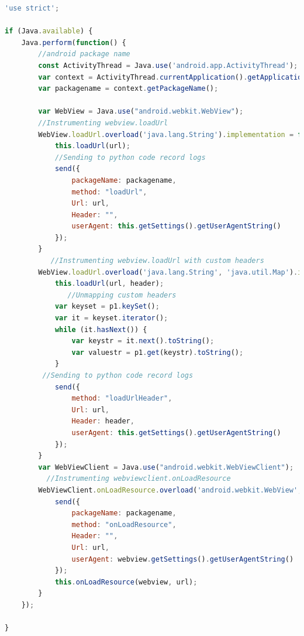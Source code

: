\begin{lstlisting}[language=JavaScript, caption=Instrumentation of Webview]    
    'use strict';

if (Java.available) {
    Java.perform(function() {
        //android package name 
        const ActivityThread = Java.use('android.app.ActivityThread');
        var context = ActivityThread.currentApplication().getApplicationContext();
        var packagename = context.getPackageName();
        
        var WebView = Java.use("android.webkit.WebView");
        //Instrumenting webview.loadUrl 
        WebView.loadUrl.overload('java.lang.String').implementation = function(url) {
            this.loadUrl(url);
            //Sending to python code record logs
            send({
                packageName: packagename,
                method: "loadUrl",
                Url: url,
                Header: "",
                userAgent: this.getSettings().getUserAgentString()
            });
        }
           //Instrumenting webview.loadUrl with custom headers
        WebView.loadUrl.overload('java.lang.String', 'java.util.Map').implementation = function(url, header) {
            this.loadUrl(url, header);
               //Unmapping custom headers
            var keyset = p1.keySet();
            var it = keyset.iterator();
            while (it.hasNext()) {
                var keystr = it.next().toString();
                var valuestr = p1.get(keystr).toString();
            }
         //Sending to python code record logs
            send({
                method: "loadUrlHeader",
                Url: url,
                Header: header,
                userAgent: this.getSettings().getUserAgentString()
            });
        }
        var WebViewClient = Java.use("android.webkit.WebViewClient");
          //Instrumenting webviewclient.onLoadResource
        WebViewClient.onLoadResource.overload('android.webkit.WebView', 'java.lang.String').implementation = function(webview, url) {
            send({
                packageName: packagename,
                method: "onLoadResource",
                Header: "",
                Url: url,
                userAgent: webview.getSettings().getUserAgentString()
            });
            this.onLoadResource(webview, url);
        }
    });

}
      \end{lstlisting}    

